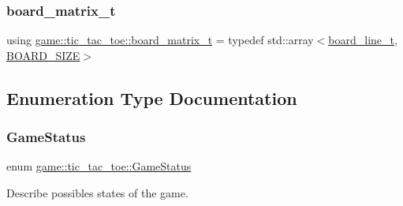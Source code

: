 \subsubsection{\texorpdfstring{board\+\_\+matrix\+\_\+t}{board\_matrix\_t}}
{\footnotesize\ttfamily using \hyperlink{namespacegame_1_1tic__tac__toe_a58fc706fe9ae58c6e9045f6927230232}{game\+::tic\+\_\+tac\+\_\+toe\+::board\+\_\+matrix\+\_\+t} = typedef std\+::array$<$\hyperlink{namespacegame_1_1tic__tac__toe_a3959bb4b3346bd3cdbf5ae9a5c58cacb}{board\+\_\+line\+\_\+t}, \hyperlink{tic__tac__toe_2_board_8hpp_a1db39eb31d1315ce982608fe25587b6d}{B\+O\+A\+R\+D\+\_\+\+S\+I\+ZE}$>$}



\subsection{Enumeration Type Documentation}
\mbox{\label{namespacegame_1_1tic__tac__toe_ad0db24b270912af1e5c2eedaa34409e5}} 
\subsubsection{\texorpdfstring{Game\+Status}{GameStatus}}
{\footnotesize\ttfamily enum \hyperlink{namespacegame_1_1tic__tac__toe_ad0db24b270912af1e5c2eedaa34409e5}{game\+::tic\+\_\+tac\+\_\+toe\+::\+Game\+Status}}



Describe possibles states of the game. 

